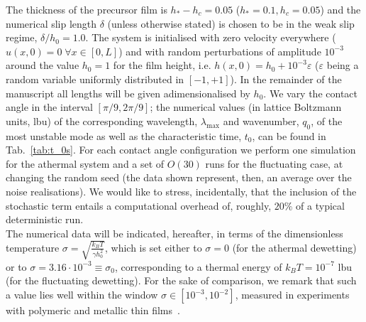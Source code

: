 The thickness of the precursor film is $h_{\ast}-h_c = 0.05$ ($h_{\ast}=0.1, h_c = 0.05$) and the numerical slip length $\delta$ (unless otherwise stated) is chosen to be in the weak slip regime, $\delta/h_0 = 1.0$. 
The system is initialised with zero velocity everywhere ($u(x,0)=0 \; \forall x \in [0, L]$) and with random perturbations of amplitude $10^{-3}$ around the value $h_0 = 1$ for the film height, i.e. $h(x,0) = h_0 + 10^{-3} \varepsilon$ ($\varepsilon$ being a random variable uniformly distributed in $[-1, +1]$).
In the remainder of the manuscript all lengths will be given adimensionalised by $h_0$.
We vary the contact angle in the interval $[\pi/9, 2\pi/9 ]$; the numerical values (in lattice Boltzmann units, lbu) of the corresponding wavelength, $\lambda_{\text{max}}$ and wavenumber, $q_0$, of the most unstable mode as well as the characteristic time, $t_0$, can be found in Tab.~\ref{tab:t_0s}.
For each contact angle configuration we perform one simulation for the athermal system and a set of $O(30)$ runs for the fluctuating case, at changing the random seed (the data shown represent, then, an average over the noise realisations). 
We would like to stress, incidentally, that the inclusion of the stochastic term entails a computational overhead of, roughly, $20\%$ of a typical deterministic run.\\ 
The numerical data will be indicated, hereafter, in terms of the dimensionless temperature $\sigma = \sqrt{\frac{k_B T}{\gamma h_0^2}}$, which is set either to $\sigma=0$ (for the athermal dewetting) or to $\sigma = 3.16 \cdot 10^{-3} \equiv \sigma_0$, corresponding to a thermal energy
of $k_B T = 10^{-7}$ lbu (for the fluctuating dewetting). 
For the sake of comparison, we remark that such a value lies well within the window $\sigma \in [10^{-3}, 10^{-2}]$, measured in experiments with polymeric and metallic thin films~\cite{fetzerThermalNoiseInfluences2007,gonzalezInstabilityLiquidCu2013}.

